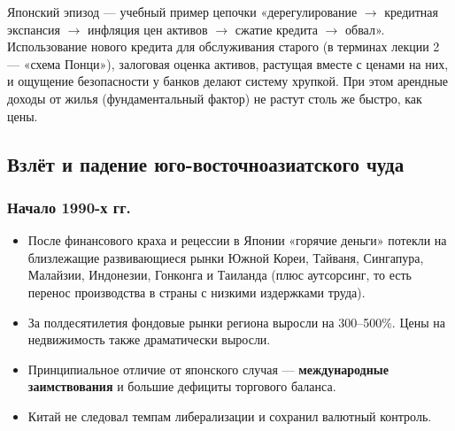 \documentclass[10pt,a4paper]{article}
\begin{document}
\begin{intuition}
Японский эпизод — учебный пример цепочки «дерегулирование $\to$ кредитная экспансия $\to$ инфляция цен активов $\to$ сжатие кредита $\to$ обвал». Использование нового кредита для обслуживания старого (в терминах лекции 2 --- «схема Понци»), залоговая оценка активов, растущая вместе с ценами на них, и ощущение безопасности у банков делают систему хрупкой. При этом арендные доходы от жилья (фундаментальный фактор) не растут столь же быстро, как цены.
\end{intuition}

\subsection{Взлёт и падение юго-восточноазиатского чуда}

\subsubsection{Начало 1990-х гг.}
\begin{itemize}[leftmargin=1.3em]
\item После финансового краха и рецессии в Японии «горячие деньги» потекли на близлежащие развивающиеся рынки Южной Кореи, Тайваня, Сингапура, Малайзии, Индонезии, Гонконга и Таиланда (плюс аутсорсинг, то есть перенос производства в страны с низкими издержками труда).
\item За полдесятилетия фондовые рынки региона выросли на 300--500\%. Цены на недвижимость также драматически выросли.
\item Принципиальное отличие от японского случая — \textbf{международные заимствования} и большие дефициты торгового баланса.
\item Китай не следовал темпам либерализации и сохранил валютный контроль.
\end{itemize}
\end{document}
